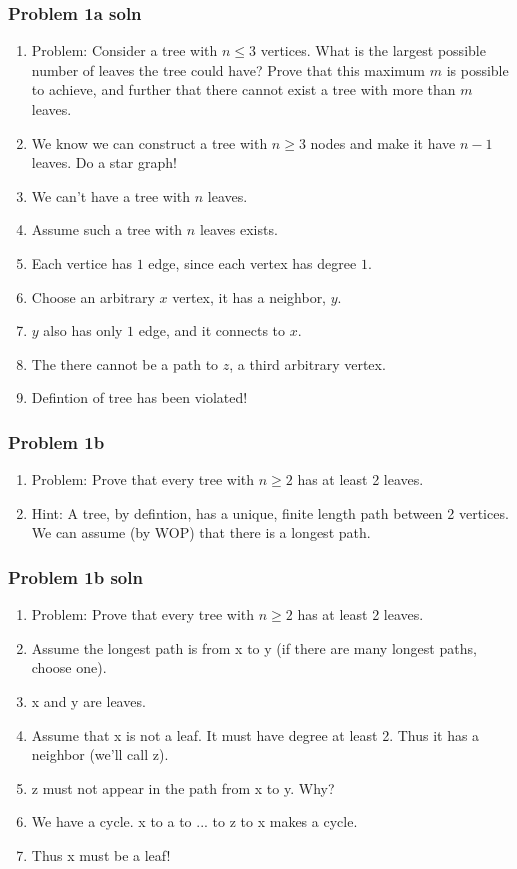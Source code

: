 \documentclass{beamer}
\begin{document}
\begin{frame}
    \frametitle{Problem 1a soln}
    \begin{enumerate}[<+->]
        \item Problem: Consider a tree with $n \leq 3$ vertices.
        What is the largest possible number of leaves the tree could have?
        Prove that this maximum $m$ is possible to achieve, and further that there cannot
        exist a tree with more than $m$ leaves.
        \item We know we can construct a tree with $n \geq 3$ nodes and make it have
        $n - 1$ leaves. Do a star graph!
        \item We can't have a tree with $n$ leaves.
        \item Assume such a tree with $n$ leaves exists.
        \item Each vertice has $1$ edge, since each vertex has degree $1$.
        \item Choose an arbitrary $x$ vertex, it has a neighbor, $y$.
        \item $y$ also has only $1$ edge, and it connects to $x$.
        \item The there cannot be a path to $z$, a third arbitrary vertex.
        \item Defintion of tree has been violated!
    \end{enumerate}
\end{frame}

\begin{frame}
    \frametitle{Problem 1b}
    \begin{enumerate}[<+->]
        \item Problem: Prove that every tree with $n \geq 2$ has at least 2 leaves.
        \item Hint: A tree, by defintion, has a unique, finite length path between 2 vertices. We can
        assume (by WOP) that there is a longest path.
    \end{enumerate}
\end{frame}

\begin{frame}
    \frametitle{Problem 1b soln}
    \begin{enumerate}[<+->]
        \item Problem: Prove that every tree with $n \geq 2$ has at least 2 leaves.
        \item Assume the longest path is from x to y (if there are many longest paths, choose one).
        \item x and y are leaves.
        \item Assume that x is not a leaf. It must have degree at least 2. Thus it has a neighbor (we'll call z).
        \item z must not appear in the path from x to y. Why?
        \item We have a cycle. x to a to ... to z to x makes a cycle.
        \item Thus x must be a leaf!
    \end{enumerate}
\end{frame}
\end{document}
